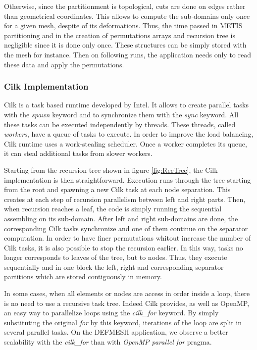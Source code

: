 \documentclass{IOS-Book-Article}
\begin{document}
Otherwise, since the partitionment is topological, cuts are done on edges rather than geometrical coordinates.
This allows to compute the sub-domains only once for a given mesh, despite of its deformations.
Thus, the time passed in METIS partitioning and in the creation of permutations arrays and recursion tree is negligible since it is done only once.
These structures can be simply stored with the mesh for instance. Then on following runs, the application needs only to read these data and apply the permutations.

\subsubsection{Cilk Implementation}
Cilk is a task based runtime developed by Intel. It allows to create parallel tasks with the \emph{spawn} keyword and to synchronize them with the \emph{sync} keyword.
All these tasks can be executed independently by threads. These threads, called \emph{workers}, have a queue of tasks to execute.
In order to improve the load balancing, Cilk runtime uses a work-stealing scheduler. Once a worker completes its queue, it can steal additional tasks from slower workers.

Starting from the recursion tree shown in figure \ref{fig:RecTree}, the Cilk implementation is then straightforward.
Execution runs through the tree starting from the root and spawning a new Cilk task at each node separation.
This creates at each step of recursion parallelism between left and right parts.
Then, when recursion reaches a leaf, the code is simply running the sequential assembling on its sub-domain.
After left and right sub-domains are done, the corresponding Cilk tasks synchronize and one of them continue on the separator computation.
In order to have finer permutations whitout increase the number of Cilk tasks, it is also possible to stop the recursion earlier.
In this way, tasks no longer corresponds to leaves of the tree, but to nodes.
Thus, they execute sequentially and in one block the left, right and corresponding separator partitions which are stored contiguously in memory.

In some cases, when all elements or nodes are access in order inside a loop, there is no need to use a recursive task tree.
Indeed Cilk provides, as well as OpenMP, an easy way to parallelize loops using the \emph{cilk\_for} keyword.
By simply substituting the original \emph{for} by this keyword, iterations of the loop are split in several parallel tasks.
On the DEFMESH application, we observe a better scalability with the \emph{cilk\_for} than with \emph{OpenMP parallel for} pragma.
\end{document}
